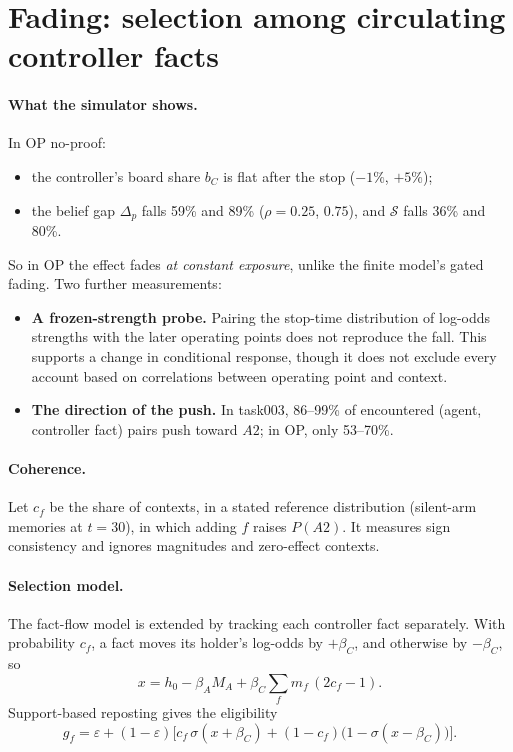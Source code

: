 \documentclass[10pt,a4paper]{article}
\theoremstyle{definition}
\newcommand{\Sus}{\mathcal S}
\begin{document}
\section{Fading: selection among circulating controller facts}
\label{sec:fading}
\paragraph{What the simulator shows.} In OP no-proof:
\begin{itemize}
\item the controller's board share $b_C$ is flat after the stop ($-1\%$, $+5\%$);
\item the belief gap $\Delta_p$ falls 59\% and 89\% ($\rho=0.25$, $0.75$), and $\Sus$ falls 36\% and 80\%.
\end{itemize}
So in OP the effect fades \emph{at constant exposure}, unlike the finite model's gated fading. Two further measurements:
\begin{itemize}
\item \textbf{A frozen-strength probe.} Pairing the stop-time distribution of log-odds strengths with the later
  operating points does not reproduce the fall. This supports a change in conditional response, though it does not
  exclude every account based on correlations between operating point and context.
\item \textbf{The direction of the push.} In task003, 86--99\% of encountered (agent, controller fact) pairs push toward
  $A2$; in OP, only 53--70\%.
\end{itemize}

\paragraph{Coherence.} Let $c_f$ be the share of contexts, in a stated reference distribution (silent-arm memories at
$t=30$), in which adding $f$ raises $P(A2)$. It measures sign consistency and ignores magnitudes and zero-effect
contexts.

\paragraph{Selection model.} The fact-flow model is extended by tracking each controller fact separately. With
probability $c_f$, a fact moves its holder's log-odds by $+\beta_C$, and otherwise by $-\beta_C$, so
\begin{equation}
x=h_0-\beta_A M_A+\beta_C\sum_f m_f\,(2c_f-1).
\end{equation}
Support-based reposting gives the eligibility
\begin{equation}
g_f=\varepsilon+(1-\varepsilon)\Big[c_f\,\sigma(x+\beta_C)+(1-c_f)\big(1-\sigma(x-\beta_C)\big)\Big].\label{eq:gf}
\end{equation}
\end{document}

